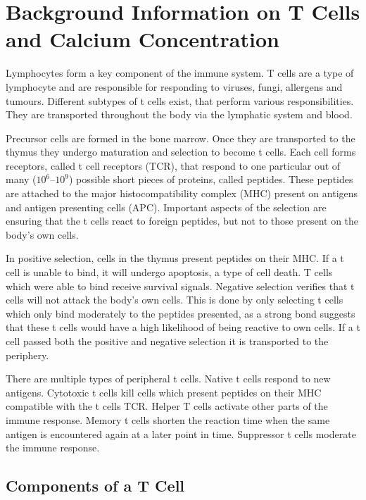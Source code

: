 \chapter{Background Information on T Cells and Calcium Concentration}
\label{chapter:t-cell}

Lymphocytes form a key component of the immune system. T cells are a type of lymphocyte and are responsible for responding to viruses, fungi, allergens and tumours. Different subtypes of t cells exist, that perform various responsibilities. They are transported throughout the body via the lymphatic system and blood.\cite{Kumar2018}

Precursor cells are formed in the bone marrow. Once they are transported to the thymus they undergo maturation and selection to become t cells. Each cell forms receptors, called t cell receptors (TCR), that respond to one particular out of many ($10^6 – 10^9$) possible short pieces of proteins, called peptides. These peptides are attached to the major histocompatibility complex (MHC) present on antigens and antigen presenting cells (APC). Important aspects of the selection are ensuring that the t cells react to foreign peptides, but not to those present on the body's own cells.\cite{Ashby2024}

In positive selection, cells in the thymus present peptides on their MHC. If a t cell is unable to bind, it will undergo apoptosis, a type of cell death. T cells which were able to bind receive survival signals. Negative selection verifies that t cells will not attack the body's own cells. This is done by only selecting t cells which only bind moderately to the peptides presented, as a strong bond suggests that these t cells would have a high likelihood of being reactive to own cells.\cite{Hagel2018} If a t cell passed both the positive and negative selection it is transported to the periphery.

There are multiple types of peripheral t cells. Native t cells respond to new antigens. Cytotoxic t cells kill cells which present peptides on their MHC compatible with the t cells TCR. Helper T cells activate other parts of the immune response. Memory t cells shorten the reaction time when the same antigen is encountered again at a later point in time. Suppressor t cells moderate the immune response.\cite{Ganong1997}

\section{Components of a T Cell}

